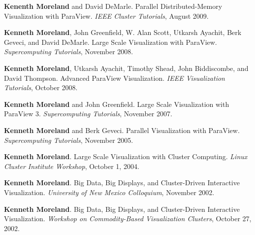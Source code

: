 \begin{enumerate}[label={[\arabic*]}, left=0pt]
  \textbf{Kenenth Moreland} and David DeMarle.
  Parallel Distributed-Memory Visualization with ParaView.
  \emph{IEEE Cluster Tutorials}, August 2009.
\item  %
  \textbf{Kenneth Moreland}, John Greenfield, W. Alan Scott, Utkarsh Ayachit, Berk Geveci, and David DeMarle.
  Large Scale Visualization with ParaView.
  \emph{Supercomputing Tutorials}, November 2008.
\item  %
  \textbf{Kenneth Moreland}, Utkarsh Ayachit, Timothy Shead, John Biddiscombe, and David Thompson.
  Advanced ParaView Visualization.
  \emph{IEEE Visualization Tutorials}, October 2008.
\item  %
  \textbf{Kenneth Moreland} and John Greenfield.
  Large Scale Visualization with ParaView 3.
  \emph{Supercomputing Tutorials}, November 2007.
\item  %
  \textbf{Kenneth Moreland} and Berk Geveci.
  Parallel Visualization with ParaView.
  \emph{Supercomputing Tutorials}, November 2005.
\item  %
  \textbf{Kenneth Moreland}.
  Large Scale Visualization with Cluster Computing.
  \emph{Linux Cluster Institute Workshop}, October 1, 2004.
\item  %
  \textbf{Kenneth Moreland}.
  Big Data, Big Displays, and Cluster-Driven Interactive Visualization.
  \emph{University of New Mexico Colloquium}, November 2002.
\item  %
  \textbf{Kenneth Moreland}.
  Big Data, Big Displays, and Cluster-Driven Interactive Visualization.
  \emph{Workshop on Commodity-Based Visualization Clusters}, October 27, 2002.
\end{enumerate}